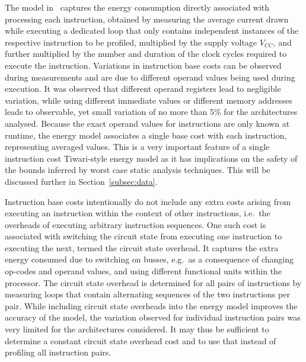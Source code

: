 The model in~\cite{Tiwari-embedded-1994} captures the energy consumption
directly associated with processing each instruction, obtained by measuring the
average current drawn while executing a dedicated loop that only contains
independent instances of the respective instruction to be profiled, multiplied
by the supply voltage $V_{CC}$, and further multiplied by the number and
duration of the clock cycles required to execute the instruction.
%
Variations in instruction base costs can be observed during measurements and
are due to different operand values being used during execution. It was observed that
different operand registers lead to negligible variation, while using different
immediate values or different memory addresses leads to observable, yet small
variation of no more than 5\% for the architectures analysed.
%
Because the exact operand values for instructions are only known at runtime,
the energy model associates a single base cost with each instruction,
representing averaged values. This is a very important feature of a single
instruction cost Tiwari-style energy model as it has implications on the safety
of the bounds inferred by worst case static analysis techniques. This will be
discussed further in Section~\ref{subsec:data}.

Instruction base costs intentionally do not include any extra costs arising
from executing an instruction within the context of other instructions, i.e.\
the overheads of executing arbitrary instruction sequences.
%
One such cost is associated with switching the circuit state from executing one
instruction to executing the next, termed the circuit state overhead. It
captures the extra energy consumed due to switching on busses, e.g.\ as a
consequence of changing op-codes and operand values, and using different
functional units within the processor. The circuit state overhead is determined
for all pairs of instructions by measuring loops that contain alternating
sequences of the two instructions per pair.
%
While including circuit state overheads into the energy model improves the
accuracy of the model, the variation observed for individual instruction pairs
was very limited for the architectures considered. It may thus be sufficient to
determine a constant circuit state overhead cost and to use that instead of
profiling all instruction pairs.

